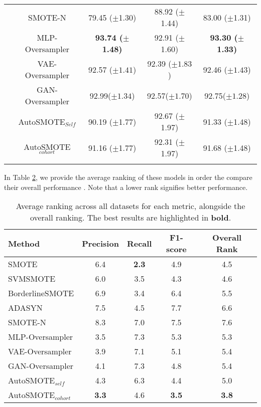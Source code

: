 \begin{longtable}{cc|ccc}
  & SMOTE-N &79.45 ($\pm$1.30)&88.92 ($\pm$1.44)&83.00 ($\pm$1.31) \\
  & MLP-Oversampler &\textbf{93.74 ($\pm$1.48)}&92.91 ($\pm$1.60)&\textbf{93.30 ($\pm$1.33)} \\
  & VAE-Oversampler & 92.57 ($\pm1.41$)&92.39 ($\pm1.83$)& 92.46 ($\pm1.43$) \\
  & GAN-Oversampler & 92.99($\pm1.34$)&92.57($\pm1.70$)& 92.75($\pm1.28$) \\
  & AutoSMOTE$_{Self}$ & 90.19 ($\pm$1.77)&92.67 ($\pm$1.97)&91.33 ($\pm$1.48)\\
  &AutoSMOTE$_{cohort}$ &91.16 ($\pm$1.77)&92.31 ($\pm$1.97)&91.68 ($\pm$1.48)\\
  \label{tab:classification}
\end{longtable}

In Table \ref{tab:ranking}, we provide the average ranking of these models in order the compare their overall performance . Note that a lower rank signifies better performance. 

\begin{table}[h!]
    \centering
    \caption{Average ranking across all datasets for each metric, alongside the overall ranking. The best results are highlighted in \textbf{bold}.}
    \begin{tabular}{lcccc}
        \toprule
        \textbf{Method} & \textbf{Precision    } & \textbf{Recall    } & \textbf{F1-score    } & \textbf{Overall Rank} \\
        \midrule
        SMOTE & 6.4 & \textbf{2.3} & 4.9 & 4.5\\
        SVMSMOTE & 6.0  & 3.5 & 4.3 & 4.6\\
        BorderlineSMOTE & 6.9 & 3.4 & 6.4 & 5.5 \\
        ADASYN & 7.5 & 4.5 & 7.7 & 6.6 \\
        SMOTE-N & 8.3 & 7.0 & 7.5 & 7.6    \\
        MLP-Oversampler & 3.5 & 7.3 & 5.3 & 5.3\\
        VAE-Oversampler & 3.9 & 7.1 & 5.1 & 5.4\\
        GAN-Oversampler  & 4.1 & 7.3& 4.8 & 5.4\\
        AutoSMOTE$_{self}$ & 4.3 & 6.3 & 4.4 & 5.0\\
        AutoSMOTE$_{cohort}$ & \textbf{3.3} & 4.6 & \textbf{3.5} & \textbf{3.8}\\
        \bottomrule
    \end{tabular}
    \label{tab:ranking}
\end{table}


